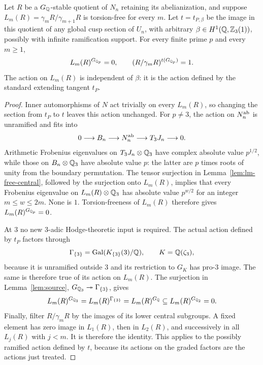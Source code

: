 \begin{lemma}
\label{lem:lm-fixed-central}
Let $R$ be a $G_\mathbb Q$-stable quotient of $N_n$ retaining its
abelianization, and suppose $L_m(R)=\gamma_mR/\gamma_{m+1}R$ is
torsion-free for every $m$. Let $t=t_{P,\beta}$ be the image in this
quotient of any global cusp section of $U_n$, with arbitrary
$\beta\in H^1(\mathbb Q,\mathbb Z_3(1))$, possibly with infinite ramification support.
For every finite prime $p$ and every $m\ge1$,
\[
 L_m(R)^{G_{\mathbb Q_p}}=0,
 \qquad
 (R/\gamma_mR)^{t(G_{\mathbb Q_p})}=1.
\]
The action on $L_m(R)$ is independent of $\beta$: it is the action defined
by the standard extending tangent $t_P$.
\end{lemma}
\begin{proof}
Inner automorphisms of $N$ act trivially on every $L_m(R)$, so changing the
section from $t_P$ to $t$ leaves this action unchanged.
For $p\ne3$, the action on $N_n^{\rm ab}$ is unramified and fits into
\[
 0\longrightarrow B_n\longrightarrow N_n^{\rm ab}
 \longrightarrow T_3J_n\longrightarrow0.
\]
Arithmetic Frobenius eigenvalues on $T_3J_n\otimes\mathbb Q_3$ have complex
absolute value $p^{1/2}$, while those on $B_n\otimes\mathbb Q_3$ have absolute
value $p$: the latter are $p$ times roots of unity from the boundary
permutation.  The tensor surjection in
Lemma~\ref{lem:lm-free-central}, followed by the surjection onto
$L_m(R)$, implies that every Frobenius eigenvalue
on $L_m(R)\otimes\mathbb Q_3$ has absolute value $p^{w/2}$ for an integer
$m\le w\le2m$.  None is $1$.  Torsion-freeness of $L_m(R)$ therefore gives
$L_m(R)^{G_{\mathbb Q_p}}=0$.

At $3$ no new $3$-adic Hodge-theoretic input is required.  The actual
action defined by $t_P$ factors through
\[
 \Gamma_{\{3\}}=\operatorname{Gal}(K_{\{3\}}(3)/\mathbb Q),
 \qquad K=\mathbb Q(\zeta_3),
\]
because it is unramified outside $3$ and its restriction to $G_K$ has
pro-$3$ image.  The same is therefore true of its action on $L_m(R)$.
The surjection in Lemma~\ref{lem:source},
$G_{\mathbb Q_3}\twoheadrightarrow\Gamma_{\{3\}}$,
gives
\[
 L_m(R)^{G_{\mathbb Q_3}}=L_m(R)^{\Gamma_{\{3\}}}
 =L_m(R)^{G_\mathbb Q}\subseteq L_m(R)^{G_{\mathbb Q_2}}=0.
\]
Finally, filter $R/\gamma_mR$ by the images of its lower central
subgroups.  A fixed element has zero image in $L_1(R)$, then in $L_2(R)$,
and successively in all $L_j(R)$ with $j<m$.  It is therefore the identity.
This applies to the possibly ramified action defined by $t$, because
its actions on the graded factors are the actions just treated.
\end{proof}

